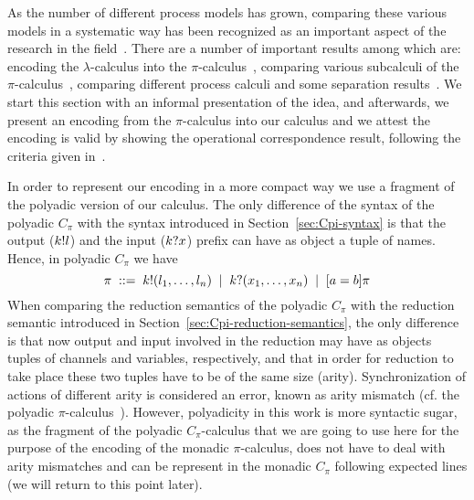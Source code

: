 As the number of different process models has grown, comparing these various models in a systematic way has been recognized as an important aspect of the research in the field~\cite{DBLP:journals/entcs/Parrow08}. There are a number of important results among which are: encoding the $\lambda$-calculus into the $\pi$-calculus~\cite{DBLP:journals/mscs/Milner92}, comparing various subcalculi of the $\pi$-calculus~\cite{ DBLP:journals/tcs/Boreale98, DBLP:conf/ecoop/HondaT91, DBLP:journals/iandc/NestmannP00}, comparing different process calculi and some separation results~\cite{ DBLP:journals/njc/CarboneM03,DBLP:journals/iandc/DardhaGS17, DBLP:journals/corr/DedeicPP15, DBLP:journals/iandc/Gorla10, DBLP:journals/iandc/LanesePSS11,   DBLP:conf/rc/MedicM16,DBLP:journals/mscs/Palamidessi03, DBLP:conf/lics/PalamidessiSVV06, DBLP:phd/ethos/Sangiorgi93}.
We start this section with an informal presentation of the idea, and afterwards, we present an encoding from the $\pi$-calculus into our calculus and we attest the encoding is valid by showing the operational correspondence result, following the criteria given in~\cite{DBLP:journals/iandc/Gorla10}.

In order to represent our encoding in a more compact way we use a fragment of the polyadic version of our calculus. 
The only difference of the syntax of the polyadic $C_\pi$ with the syntax introduced in Section~\ref{sec:Cpi-syntax} is that the output ($k!l$) and the input ($k?x$) prefix can have as object a tuple of names. Hence, in polyadic $C_\pi$ we have 
\[
\pi \;::=\; k!(l_1, \ldots, l_n) \;\;|\;\; k?(x_1, \ldots, x_n) \;\;|\;\; [ a = b ]\pi
\]
When comparing the reduction semantics of the polyadic $C_\pi$ with the reduction semantic introduced in Section~\ref{sec:Cpi-reduction-semantics}, the only difference is that now output and input involved in the reduction may have as objects tuples of channels and variables, respectively,  and that in order for reduction to take place these two tuples have to be of the same size (arity). Synchronization of actions of different arity is considered an error, known as arity mismatch (cf. the polyadic $\pi$-calculus~\cite{DBLP:conf/concur/Milner92}).
However, polyadicity in this work is more syntactic sugar, as the fragment of the polyadic $C_\pi$-calculus that we are going to use here for the purpose of the encoding of the monadic $\pi$-calculus, does not have to deal with arity mismatches and can be represent in the monadic $C_\pi$ following expected lines (we will return to this point later). 


